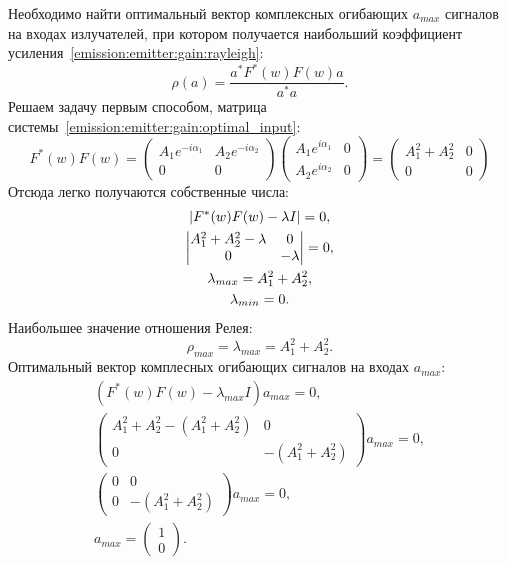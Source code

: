 Необходимо найти оптимальный вектор комплексных огибающих $a_{max}$ сигналов на входах излучателей, при котором получается наибольший коэффициент
усиления~\eqref{emission:emitter:gain:rayleigh}:
\[
    \rho(a)
    = \frac{a^*F^*(w)F(w) a}{a^*a}.
\]
Решаем задачу первым способом, матрица системы~\eqref{emission:emitter:gain:optimal_input}:
\[
    F^*(w) F(w)
    =
    \begin{pmatrix}
        A_1 e^{-i \alpha_1} & A_2 e^{-i \alpha_2} \\
        0                   & 0
    \end{pmatrix}
    \begin{pmatrix}
        A_1 e^{i \alpha_1} & 0 \\
        A_2 e^{i \alpha_2} & 0
    \end{pmatrix}
    =
    \begin{pmatrix}
        A_1^2 + A_2^2 & 0 \\
        0             & 0
    \end{pmatrix}
\]
Отсюда легко получаются собственные числа:
\begin{gather*}
    \determinant{F^*(w) F(w) - \lambda I} = 0 , \\
%
    \begin{vmatrix}
        A_1^2 + A_2^2 - \lambda & 0         \\
        0                       & - \lambda
    \end{vmatrix}
    = 0 , \\
%
    \lambda_{max} = A_1^2 + A_2^2 , \\
    \lambda_{min} = 0 .
\end{gather*}
Наибольшее значение отношения Релея:
\[
    \rho_{max} = \lambda_{max} = A_1^2 + A_2^2 .
\]
Оптимальный вектор комплесных огибающих сигналов на входах $a_{max}$:
\begin{gather*}
    ( F^*(w) F(w) - \lambda_{max} I ) a_{max} = 0 , \\
%
    \begin{pmatrix}
        A_1^2 + A_2^2 - (A_1^2 + A_2^2) & 0                 \\
        0                               & - (A_1^2 + A_2^2)
    \end{pmatrix}
    a_{max} = 0 , \\
%
    \begin{pmatrix}
        0 & 0                 \\
        0 & - (A_1^2 + A_2^2)
    \end{pmatrix}
    a_{max} = 0 , \\
%
    a_{max}
    = \begin{pmatrix}
          1 \\
          0
    \end{pmatrix} .
\end{gather*}
